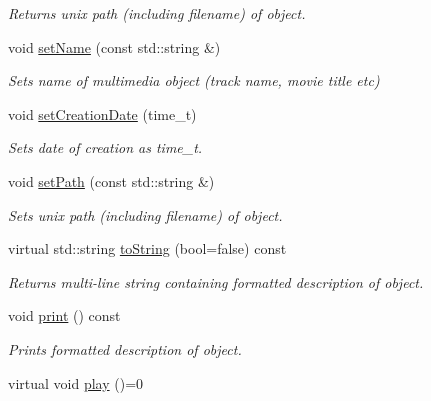 \begin{DoxyCompactItemize}
\begin{DoxyCompactList}\small\item\em Returns unix path (including filename) of object. \end{DoxyCompactList}\item 
\hypertarget{classBaseObject_a7d8dca471d4e0eb15620f518f48d2a8c}{void \hyperlink{classBaseObject_a7d8dca471d4e0eb15620f518f48d2a8c}{set\-Name} (const std\-::string \&)}\label{classBaseObject_a7d8dca471d4e0eb15620f518f48d2a8c}

\begin{DoxyCompactList}\small\item\em Sets name of multimedia object (track name, movie title etc) \end{DoxyCompactList}\item 
\hypertarget{classBaseObject_aeeb327051d61bd727722f583fa0bc41c}{void \hyperlink{classBaseObject_aeeb327051d61bd727722f583fa0bc41c}{set\-Creation\-Date} (time\-\_\-t)}\label{classBaseObject_aeeb327051d61bd727722f583fa0bc41c}

\begin{DoxyCompactList}\small\item\em Sets date of creation as time\-\_\-t. \end{DoxyCompactList}\item 
\hypertarget{classBaseObject_a7841749de25678d8cbedf021e760cbee}{void \hyperlink{classBaseObject_a7841749de25678d8cbedf021e760cbee}{set\-Path} (const std\-::string \&)}\label{classBaseObject_a7841749de25678d8cbedf021e760cbee}

\begin{DoxyCompactList}\small\item\em Sets unix path (including filename) of object. \end{DoxyCompactList}\item 
\hypertarget{classBaseObject_af433968d291ebfc54c701987047f9348}{virtual std\-::string \hyperlink{classBaseObject_af433968d291ebfc54c701987047f9348}{to\-String} (bool=false) const }\label{classBaseObject_af433968d291ebfc54c701987047f9348}

\begin{DoxyCompactList}\small\item\em Returns multi-\/line string containing formatted description of object. \end{DoxyCompactList}\item 
void \hyperlink{classBaseObject_a9bad65dddde7dec1ea622edce664cc9f}{print} () const 
\begin{DoxyCompactList}\small\item\em Prints formatted description of object. \end{DoxyCompactList}\item 
\hypertarget{classBaseObject_a63e43537301807233867a3b61052f5a6}{virtual void \hyperlink{classBaseObject_a63e43537301807233867a3b61052f5a6}{play} ()=0}\label{classBaseObject_a63e43537301807233867a3b61052f5a6}


\end{DoxyCompactItemize}
